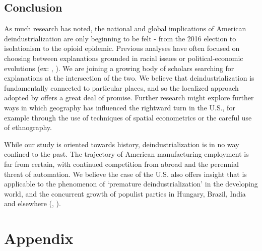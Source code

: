 \documentclass[]{AEA}
\begin{document}
\subsection{Conclusion}

As much research has noted, the national and global implications of
American deindustrialization are only beginning to be felt - from the
2016 election to isolationism to the opioid epidemic. Previous analyses
have often focused on choosing between explanations grounded in racial
issues or political-economic evolutions (ex: \cite{Green19},
\cite{Reny19}). We are joining a growing body of scholars searching for
explanations at the intersection of the two. We believe that
deindustrialization is fundamentally connected to particular places, and
so the localized approach adopted by \cite{Baccini21} offers a great
deal of promise. Further research might explore further ways in which
geography has influenced the rightward turn in the U.S., for example
through the use of techniques of spatial econometrics or the careful use
of ethnography.

While our study is oriented towards history, deindustrialization is in
no way confined to the past. The trajectory of American manufacturing
employment is far from certain, with continued competition from abroad
and the perennial threat of automation. We believe the case of the U.S.
also offers insight that is applicable to the phenomenon of `premature
deindustrialization' in the developing world, and the concurrent growth
of populist parties in Hungary, Brazil, India and elsewhere
(\cite{Rodrik15}, \cite{Castillo16}).

\nocite{Stargazer}




\appendix

\section{Appendix}
\end{document}
